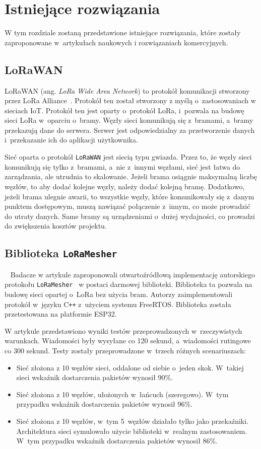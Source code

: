 \chapter{Istniejące rozwiązania}
W tym rozdziale zostaną przedstawione istniejące rozwiązania, które zostały zaproponowane w~artykułach naukowych i rozwiązaniach komercyjnych.
\section{LoRaWAN}

LoRaWAN (ang. \emph{LoRa Wide Area Network}) to protokół komunikacji stworzony przez LoRa Alliance~\cite{lora:about}.
Protokół ten został stworzony z myślą o~zastosowaniach w sieciach IoT.
Protokół ten jest oparty o~protokół LoRa, i~pozwala na budowę sieci LoRa w~oparciu o~bramy.
Węzły sieci komunikują się z~bramami, a~bramy przekazują dane do serwera.
Serwer jest odpowiedzialny za przetworzenie danych i~przekazanie ich do aplikacji użytkownika.

Sieć oparta o protokół \texttt{LoRaWAN} jest siecią typu gwiazda. Przez to, że węzły sieci komunikują się tylko z~bramami, a~nie z~innymi węzłami, sieć jest łatwa do zarządzania, ale utrudnia to skalowanie. Jeżeli brama osiągnie maksymalną liczbę węzłów, to aby dodać kolejne węzły, należy dodać kolejną bramę. Dodatkowo, jeżeli brama ulegnie awarii, to wszystkie węzły, które komunikowały się z~danym punktem dostępowym, muszą nawiązać połączenie z~innym, co może prowadzić do utraty danych. Same bramy są urządzeniami o~dużej wydajności, co prowadzi do zwiększenia kosztów projektu.


\section{Biblioteka \texttt{LoRaMesher}}~\label{sec:loramesher}
Badacze w artykule zaproponowali otwartoźródłową implementację autorskiego protokołu \texttt{LoRaMesher}~\cite{bib:loramesher} w postaci darmowej biblioteki.
Biblioteka ta pozwala na budowę sieci opartej o~LoRa bez użycia bram.
Autorzy zaimplementowali protokół w~języku C\texttt{++} z~użyciem systemu FreeRTOS.
Biblioteka została przetestowana na platformie ESP32.

W artykule przedstawiono wyniki testów przeprowadzonych w~rzeczywistych warunkach.
Wiadomości były wysyłane co 120 sekund, a~wiadomości rutingowe co 300 sekund.
Testy zostały przeprowadzone w~trzech różnych scenariuszach:

\begin{itemize}
    \item Sieć złożona z 10 węzłów sieci, oddalone od siebie o~jeden skok. W~takiej sieci wskaźnik dostarczenia pakietów wynosił 90\%.
    \item Sieć złożona z 10 węzłów, ułożonych w~łańcuch (szeregowo). W~tym przypadku wskaźnik dostarczenia pakietów wynosił 96\%.
    \item Sieć złożona z 10 węzłów, w~tym 5~węzłów działało tylko jako przekaźniki. Architektura sieci symulowało użycie biblioteki w~realnym zastosowaniem. W~tym przypadku wskaźnik dostarczenia pakietów wynosił 86\%.
\end{itemize}

